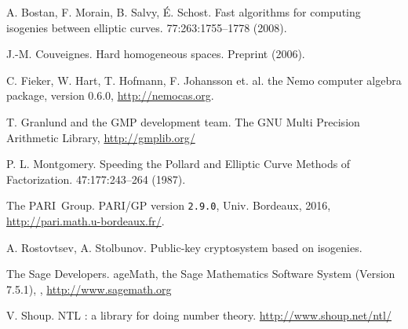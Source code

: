 \documentclass[12pt]{article}
\begin{document}
\begin{thebibliography}{99}

A. Bostan, F. Morain, B. Salvy, \'E. Schost.
\newblock Fast algorithms for computing isogenies between elliptic curves.
 77:263:1755--1778 (2008).

J.-M. Couveignes.
\newblock Hard homogeneous spaces.
\newblock Preprint (2006).

C. Fieker, W. Hart, T. Hofmann, F. Johansson et. al.
\newblock the Nemo computer algebra package, version 0.6.0, \url{http://nemocas.org}.

T. Granlund and the GMP development team.
\newblock The GNU Multi Precision Arithmetic Library, \url{http://gmplib.org/}

P. L. Montgomery.
\newblock Speeding the Pollard and Elliptic Curve Methods of Factorization.
 47:177:243--264 (1987).

The PARI~Group.
\newblock PARI/GP version {\tt 2.9.0}, Univ. Bordeaux, 2016, \url{http://pari.math.u-bordeaux.fr/}.

A. Rostovtsev, A. Stolbunov.
\newblock Public-key cryptosystem based on isogenies.

The Sage Developers.
ageMath, the {S}age {M}athematics {S}oftware {S}ystem ({V}ersion
  7.5.1),
, \url{http://www.sagemath.org}

V. Shoup.
\newblock NTL : a library for doing number theory.
\newblock \url{http://www.shoup.net/ntl/}


\end{thebibliography}
\end{document}
